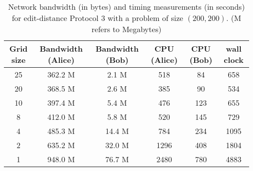 \begin{table}
\begin{centering}
\begin{tabular}{|c||c|c|c|c|c|}
\hline 
Grid size &
Bandwidth (Alice) &
Bandwidth (Bob) &
CPU (Alice) &
CPU (Bob) &
wall clock \tabularnewline
\hline
\hline 
25 &
362.2 M &
2.1 M &
518 &
84 &
658 \tabularnewline
\hline 
20 &
368.5 M &
2.6 M &
385 &
90 &
534 \tabularnewline
\hline 
10 &
397.4 M &
5.4 M &
476 &
123 &
655 \tabularnewline
\hline 
8 &
412.0 M &
5.8 M &
520 &
145 &
729 \tabularnewline
\hline 
4 &
485.3 M &
14.4 M &
784 &
234 &
1095 \tabularnewline
\hline 
2 &
635.2 M&
32.0 M&
1296 &
408 &
1804 \tabularnewline
\hline 
1&
948.0 M&
76.7 M&
2480 &
780 &
4883 \tabularnewline
\hline
\end{tabular}
\par\end{centering}

\caption{Network bandwidth (in bytes) and timing measurements (in seconds)
for edit-distance Protocol 3 with a problem of size $(200,200)$.
(M refers to Megabytes)}

\label{protocol3table200} 
\end{table}





